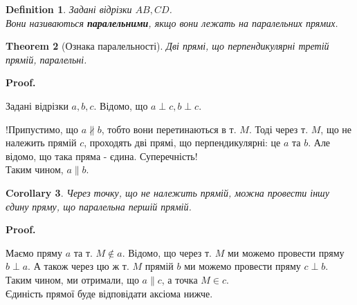 \documentclass[a4paper, 10pt]{article}
\makeatletter
\def\qed{$\blacksquare$}
\theoremstyle{theoremdd}
\newtheorem{theorem}{Theorem}[subsection]
\theoremstyle{theoremdd}
\theoremstyle{theoremdd}
\newtheorem{definition}[theorem]{Definition}
\theoremstyle{theoremdd}
\theoremstyle{theoremdd}
\theoremstyle{theoremdd}
\theoremstyle{theoremdd}
\theoremstyle{theoremdd}
\theoremstyle{theoremdd}
\newtheorem{corollary}[theorem]{Corollary}
\renewenvironment{proof}[1][Proof.\\]{\par
\pushQED{\hfill \qed}%
\normalfont \topsep6\p@\@plus6\p@\relax
\trivlist
\item\relax
{\bfseries
#1\@addpunct{.}}\hspace\labelsep\ignorespaces
}{%
\popQED\endtrivlist\@endpefalse
}
\makeatother
\begin{document}
\begin{definition}
Задані відрізки $AB,CD$.\\
Вони називаються \textbf{паралельними}, якщо вони лежать на паралельних прямих.
\begin{figure}[H]
\centering
{}
\end{figure}
\end{definition}

\begin{theorem}[Ознака паралельності]
Дві прямі, що перпендикулярні третій прямій, паралельні.
\end{theorem}

\begin{proof}
Задані відрізки $a,b,c$. Відомо, що $a \perp c, b \perp c$.\\
\begin{figure}[H]
\centering
{}
\end{figure}
!Припустимо, що $a \not\parallel b$, тобто вони перетинаються в т. $M$. Тоді через т. $M$, що не належить прямій $c$, проходять дві прямі, що перпендикулярні: це $a$ та $b$. Але відомо, що така пряма - єдина. Суперечність!\\
Таким чином, $a \parallel b$.
\end{proof}

\begin{corollary}
Через точку, що не належить прямій, можна провести іншу єдину пряму, що паралельна першій прямій.
\end{corollary}

\begin{proof}
Маємо пряму $a$ та т. $M \not\in a$. Відомо, що через т. $M$ ми можемо провести пряму $b \perp a$. А також через цю ж т. $M$ прямій $b$ ми можемо провести пряму $c \perp b$.\\
Таким чином, ми отримали, що $a \parallel c$, а точка $M \in c$.\\
Єдиність прямої буде відповідати аксіома нижче.
\end{proof}
\end{document}
